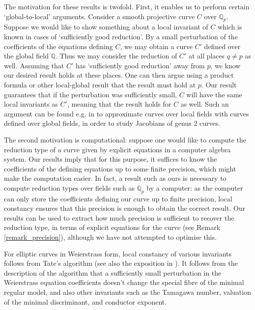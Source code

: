 \documentclass{article}
\theoremstyle{definition}
\theoremstyle{plain}
\theoremstyle{remark}
\begin{document}
	The motivation for these results is twofold. First, it enables us to perform certain `global-to-local' arguments. Consider a smooth projective curve $C$ over $\mathbb{Q}_p$. Suppose we would like to show something about a local invariant of $C$ which is known in cases of `sufficiently good reduction'. By a small perturbation of the coefficients of the equations defining $C$, we may obtain a curve $C'$ defined over the global field $\mathbb{Q}$. Thus we may consider the reduction of $C'$ at all places $q\not=p$ as well. Assuming that $C'$ has `sufficiently good reduction' away from $p$, we know our desired result holds at these places. One can then argue using a product formula or other local-global result that the result must hold at $p$. Our result guarantees that if the perturbation was sufficiently small, $C$ will have the same local invariants as $C'$, meaning that the result holds for $C$ as well. Such an argument can be found e.g. in \cite[Section 11]{parity_abelian_surfaces} to approximate curves over local fields with curves defined over global fields, in order to study Jacobians of genus 2 curves.
	
	The second motivation is computational: suppose one would like to compute the reduction type of a curve given by explicit equations in a computer algebra system. Our results imply that for this purpose, it suffices to know the coefficients of the defining equations up to some finite precision, which might make the computation easier. In fact, a result such as ours is necessary to compute reduction types over fields such as $\mathbb{Q}_p$ by a computer: as the computer can only store the coefficients defining our curve up to finite precision, local constancy ensures that this precision is enough to obtain the correct result. Our results can be used to extract how much precision is sufficient to recover the reduction type, in terms of explicit equations for the curve (see Remark \ref{remark_precision}), although we have not attempted to optimise this.
	
	For elliptic curves in Weierstrass form, local constancy of various invariants follows from Tate's algorithm \cite{tate_algorithm} (see also the exposition in \cite[Chapter IV, §9]{silverman_advanced}). It follows from the description of the algorithm that a sufficiently small perturbation in the Weierstrass equation coefficients doesn't change the special fibre of the minimal regular model, and also other invariants such as the Tamagawa number, valuation of the minimal discriminant, and conductor exponent.
	
\end{document}
